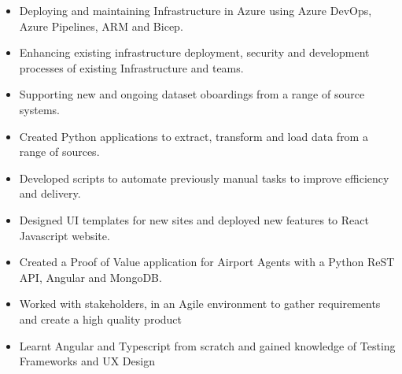 \documentclass[10pt,a4paper,ragged2e]{maltacv}
\begin{document}


\makecvheader


\begin{itemize}
  \item Deploying and maintaining Infrastructure in Azure using Azure DevOps, Azure Pipelines, ARM and Bicep.
  \item Enhancing existing infrastructure deployment, security and development processes of existing Infrastructure and teams.
  \item Supporting new and ongoing dataset oboardings from a range of source systems.
\end{itemize}

\divider

\begin{itemize}
  \item Created Python applications to extract, transform and load data from a range of sources.
  \item Developed scripts to automate previously manual tasks to improve efficiency and delivery.
  \item Designed UI templates for new sites and deployed new features to React Javascript website.
\end{itemize}

\divider

\begin{itemize}
  \item Created a Proof of Value application for Airport Agents with a Python ReST API, Angular and MongoDB.
  \item Worked with stakeholders, in an Agile environment to gather requirements and create a high quality product
  \item Learnt Angular and Typescript from scratch and gained knowledge of Testing Frameworks and UX Design
\end{itemize}
\end{document}
